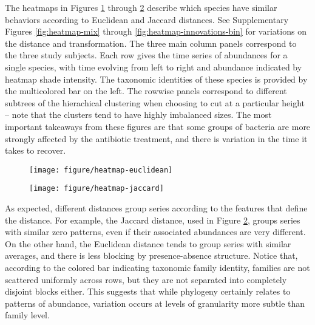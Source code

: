 \documentclass[14pt]{extreport}
\begin{document}
The heatmaps in Figures \ref{fig:heatmap-euclidean} through
\ref{fig:heatmap-jaccard} describe which species have similar behaviors
according to Euclidean and Jaccard distances. See Supplementary Figures
\ref{fig:heatmap-mix} through \ref{fig:heatmap-innovations-bin} for variations
on the distance and transformation.
The three main column panels correspond to the three study subjects. Each row
gives the time series of abundances for a single species, with time evolving
from left to right and abundance indicated by heatmap shade intensity. The
taxonomic identities of these species is provided by the multicolored bar on the
left. The rowwise panels correspond to different subtrees of the hierachical
clustering when choosing to cut at a particular height -- note that the clusters
tend to have highly imbalanced sizes. The most important takeaways from these
figures are that some groups of bacteria are more strongly affected by the
antibiotic treatment, and there is variation in the time it takes to recover.

\begin{figure}
  \centering
  \texttt{[image: figure/heatmap-euclidean]}
  \caption{\label{fig:heatmap-euclidean} }
\end{figure}

\begin{figure}
  \centering
  \texttt{[image: figure/heatmap-jaccard]}
  \caption{\label{fig:heatmap-jaccard} }
\end{figure}

As expected, different distances group series according to the features that
define the distance. For example, the Jaccard distance, used in Figure
\ref{fig:heatmap-jaccard}, groups series with similar zero patterns, even if
their associated abundances are very different. On the other hand, the Euclidean
distance tends to group series with similar averages, and there is less blocking
by presence-absence structure. Notice that, according to the colored bar
indicating taxonomic family identity, families are not scattered uniformly
across rows, but they are not separated into completely disjoint blocks either.
This suggests that while phylogeny certainly relates to patterns of abundance,
variation occurs at levels of granularity more subtle than family level.
\end{document}

